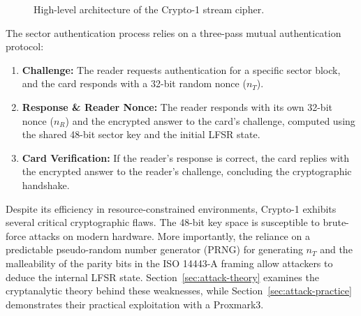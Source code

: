 \documentclass[sigconf]{acmart}
\begin{document}
\begin{figure}[H]
\centering
{}
\caption{High-level architecture of the Crypto-1 stream cipher.}
\label{fig:crypto1_arch}
\end{figure}

The sector authentication process relies on a three-pass mutual authentication protocol:
\begin{enumerate}
    \item \textbf{Challenge:} The reader requests authentication for a specific sector block, and the card responds with a 32-bit random nonce ($n_T$).
    \item \textbf{Response \& Reader Nonce:} The reader responds with its own 32-bit nonce ($n_R$) and the encrypted answer to the card's challenge, computed using the shared 48-bit sector key and the initial LFSR state.
    \item \textbf{Card Verification:} If the reader's response is correct, the card replies with the encrypted answer to the reader's challenge, concluding the cryptographic handshake.
\end{enumerate}

Despite its efficiency in resource-constrained environments, Crypto-1 exhibits several critical cryptographic flaws. The 48-bit key space is susceptible to brute-force attacks on modern hardware. More importantly, the reliance on a predictable pseudo-random number generator (PRNG) for generating $n_T$ and the malleability of the parity bits in the ISO 14443-A framing allow attackers to deduce the internal LFSR state. Section~\ref{sec:attack-theory} examines the cryptanalytic theory behind these weaknesses, while Section~\ref{sec:attack-practice} demonstrates their practical exploitation with a Proxmark3.
\end{document}
